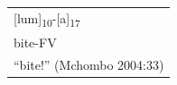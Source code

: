 \begin{tabular}{@{}l@{}}
\Large \textcolor{planarhighlight}{[lum]\textsubscript{10}}-\textcolor{planarhighlight}{[a]\textsubscript{17}} \\[4pt]
\large bite-FV \\[12pt]
\parbox[t]{72.4406pt}{\raggedright\Large ``bite!'' (Mchombo 2004:33)} \\
\end{tabular}
